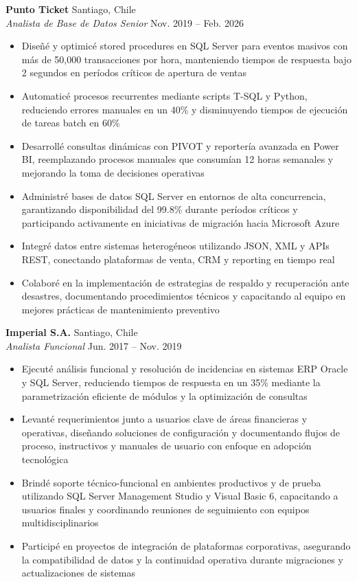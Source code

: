 \documentclass[11pt,letterpaper]{article}
\begin{document}
\textbf{Punto Ticket} \hfill Santiago, Chile\\
\textit{Analista de Base de Datos Senior} \hfill Nov. 2019 – Feb. 2026
\begin{itemize}
  \item Diseñé y optimicé stored procedures en SQL Server para eventos masivos con más de 50,000 transacciones por hora, manteniendo tiempos de respuesta bajo 2 segundos en períodos críticos de apertura de ventas
  \item Automaticé procesos recurrentes mediante scripts T-SQL y Python, reduciendo errores manuales en un 40\% y disminuyendo tiempos de ejecución de tareas batch en 60\%
  \item Desarrollé consultas dinámicas con PIVOT y reportería avanzada en Power BI, reemplazando procesos manuales que consumían 12 horas semanales y mejorando la toma de decisiones operativas
  \item Administré bases de datos SQL Server en entornos de alta concurrencia, garantizando disponibilidad del 99.8\% durante períodos críticos y participando activamente en iniciativas de migración hacia Microsoft Azure
  \item Integré datos entre sistemas heterogéneos utilizando JSON, XML y APIs REST, conectando plataformas de venta, CRM y reporting en tiempo real
  \item Colaboré en la implementación de estrategias de respaldo y recuperación ante desastres, documentando procedimientos técnicos y capacitando al equipo en mejores prácticas de mantenimiento preventivo
\end{itemize}
\vspace{2pt}
\textbf{Imperial S.A.} \hfill Santiago, Chile\\
\textit{Analista Funcional} \hfill Jun. 2017 – Nov. 2019
\begin{itemize}
  \item Ejecuté análisis funcional y resolución de incidencias en sistemas ERP Oracle y SQL Server, reduciendo tiempos de respuesta en un 35\% mediante la parametrización eficiente de módulos y la optimización de consultas
  \item Levanté requerimientos junto a usuarios clave de áreas financieras y operativas, diseñando soluciones de configuración y documentando flujos de proceso, instructivos y manuales de usuario con enfoque en adopción tecnológica
  \item Brindé soporte técnico-funcional en ambientes productivos y de prueba utilizando SQL Server Management Studio y Visual Basic 6, capacitando a usuarios finales y coordinando reuniones de seguimiento con equipos multidisciplinarios
  \item Participé en proyectos de integración de plataformas corporativas, asegurando la compatibilidad de datos y la continuidad operativa durante migraciones y actualizaciones de sistemas
\end{itemize}
\end{document}
